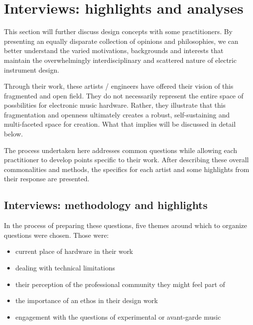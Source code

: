 \chapter{Interviews: highlights and analyses}\label{interviews}
This section will further discuss design concepts with some practitioners. By presenting an equally disparate collection of opinions and philosophies, we can better understand the varied motivations, backgrounds and interests that maintain the overwhelmingly interdisciplinary and scattered nature of electric instrument design. 

Through their work, these artists / engineers have offered their vision of this fragmented and open field. They do not necessarily represent the entire space of possbilities for electronic music hardware. Rather, they illustrate that this fragmentation and openness ultimately creates a robust, self-sustaining and multi-faceted space for creation. What that implies will be discussed in detail below.

The process undertaken here addresses common questions while allowing each practitioner to develop points specific to their work. After describing these overall commonalities and methods, the specifics for each artist and some highlights from their response are presented. 

\section{Interviews: methodology and highlights}

In the process of preparing these questions, five themes around which to organize questions were chosen. Those were: 

\begin{itemize}
	\item current place of hardware in their work 
	\item dealing with technical limitations
	\item their perception of the professional community they might feel part of
	\item the importance of an ethos in their design work
	\item engagement with the questions of experimental or avant-garde music 
	\end{itemize}

